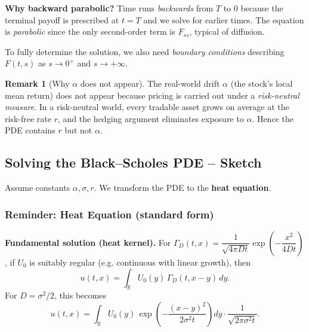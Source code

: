 \documentclass[12pt,a4paper]{article}
\theoremstyle{definition}
\newtheorem{remark}{Remark}[section]
\newcommand{\R}{\mathbb{R}}
\begin{document}
\textbf{Why backward parabolic?} Time runs \emph{backwards} from $T$ to $0$ because the terminal payoff is prescribed at $t=T$ and we solve for earlier times. The equation is \emph{parabolic} since the only second-order term is $F_{ss}$, typical of diffusion.

To fully determine the solution, we also need \emph{boundary conditions} describing $F(t,s)$ as $s\to 0^+$ and $s\to +\infty$.

\begin{remark}[Why $\alpha$ does not appear]
The real-world drift $\alpha$ (the stock's local mean return) does not appear because pricing is carried out under a \emph{risk-neutral measure}. In a risk-neutral world, every tradable asset grows on average at the risk-free rate $r$, and the hedging argument eliminates exposure to $\alpha$. Hence the PDE contains $r$ but not $\alpha$.
\end{remark}

\subsection{Solving the Black--Scholes PDE -- Sketch}

Assume constants $\alpha,\sigma,r$. We transform the PDE to the \textbf{heat equation}.

\subsubsection*{Reminder: Heat Equation (standard form)}

\begin{center}
\end{center}

\textbf{Fundamental solution (heat kernel).} For $\Gamma_D(t,x) = \dfrac{1}{\sqrt{4\pi D t}}\exp\!\left(-\dfrac{x^2}{4Dt}\right)$, if $U_0$ is suitably regular (e.g. continuous with linear growth), then
\[
u(t,x) = \int_{\R} U_0(y)\, \Gamma_D(t, x-y)\,dy.
\]
For $D = \sigma^2/2$, this becomes
\[
u(t,x) = \int_{\R} U_0(y)\, \exp\!\left(-\frac{(x-y)^2}{2\sigma^2 t}\right) dy \cdot \frac{1}{\sqrt{2\pi \sigma^2 t}}.
\]
\end{document}
